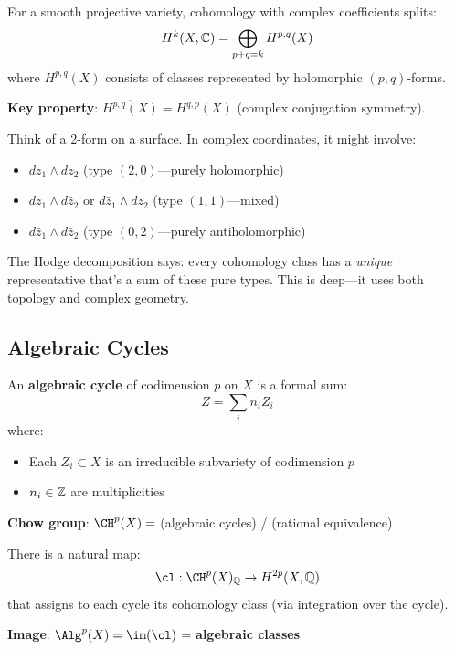\begin{defn}\label{def:hodge-decomposition}
For a smooth projective variety, cohomology with complex coefficients splits:
\begin{equation}
H^k(X, \mathbb{C}) = \bigoplus_{p+q=k} H^{p,q}(X)
\end{equation}
where $H^{p,q}(X)$ consists of classes represented by holomorphic $(p,q)$-forms.

\textbf{Key property}: $\overline{H^{p,q}(X)} = H^{q,p}(X)$ (complex conjugation symmetry).
\end{defn}

\begin{intuitive}
Think of a 2-form on a surface. In complex coordinates, it might involve:
\begin{itemize}
\item $dz_1 \wedge dz_2$ (type $(2,0)$—purely holomorphic)
\item $dz_1 \wedge d\bar{z}_2$ or $d\bar{z}_1 \wedge dz_2$ (type $(1,1)$—mixed)
\item $d\bar{z}_1 \wedge d\bar{z}_2$ (type $(0,2)$—purely antiholomorphic)
\end{itemize}

The Hodge decomposition says: every cohomology class has a \textit{unique} representative that's a sum of these pure types. This is deep—it uses both topology and complex geometry.
\end{intuitive}

\subsection{Algebraic Cycles}

\begin{defn}\label{def:algebraic-cycles}
An \textbf{algebraic cycle} of codimension $p$ on $X$ is a formal sum:
\begin{equation}
Z = \sum_{i} n_i Z_i
\end{equation}
where:
\begin{itemize}
\item Each $Z_i \subset X$ is an irreducible subvariety of codimension $p$
\item $n_i \in \mathbb{Z}$ are multiplicities
\end{itemize}

\textbf{Chow group}: $\CH^p(X) = $ (algebraic cycles) / (rational equivalence)
\end{defn}

\begin{defn}\label{def:cycle-class-map}
There is a natural map:
\begin{equation}
\cl: \CH^p(X)_\Q \to H^{2p}(X, \Q)
\end{equation}
that assigns to each cycle its cohomology class (via integration over the cycle).

\textbf{Image}: $\Alg^p(X) = \im(\cl)$ = \textbf{algebraic classes}
\end{defn}

